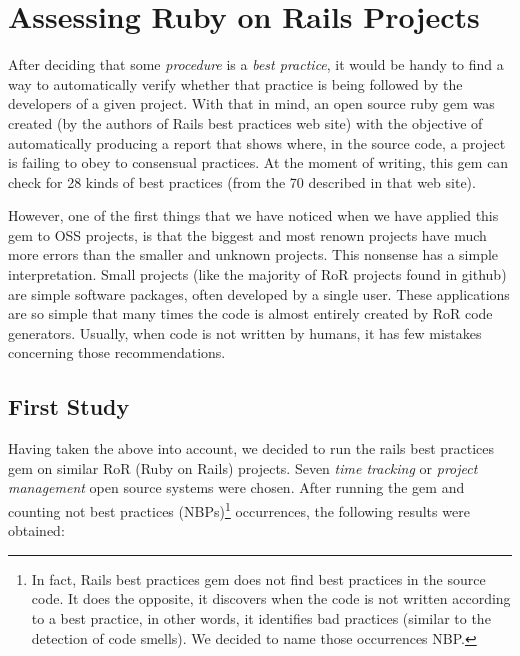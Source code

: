 \thispagestyle{empty}
\chapter{Assessing Ruby on Rails Projects}\label{chap:assissing_ror}

After deciding that some \emph{procedure} is a \emph{best practice},
it would be handy to find a way to automatically verify whether that practice is being followed by
the developers of a given project.
With that in mind, an open source ruby gem was created (by the authors of Rails best practices web site) 
with the objective of automatically producing a report that shows where,
in the source code,  a project is failing to obey to consensual practices.
At the moment of writing, this gem can check for 28 kinds of best practices (from the 70 described in that web site).

However, one of the first things that we have noticed when we have applied this gem to OSS projects,
is that the biggest and most renown projects have much more errors than the smaller and unknown projects.
This nonsense has a simple  interpretation.
Small projects (like the majority of RoR projects found in github) are simple software packages,  often 
developed by a single user.
These applications are so simple that many times the code is almost entirely created by RoR code generators.
Usually, when code is not written by humans, it has few mistakes concerning those recommendations.

\section{First Study}\label{subsec:first_study}
Having taken the above into account, we decided to run the rails best practices gem on similar RoR (Ruby on Rails) projects.
Seven \emph{time tracking} or \emph{project management} open source systems were chosen.
After running the gem and counting
\textsf{not best practices (NBPs)}\footnote{In fact, Rails best practices gem does not find best practices in the source code.
  It does the opposite, it discovers when the code is not written according to a best practice, in other words, 
  it identifies bad practices (similar to the detection of code smells).
  We decided to name those occurrences NBP.
}
occurrences, the following results were obtained:



